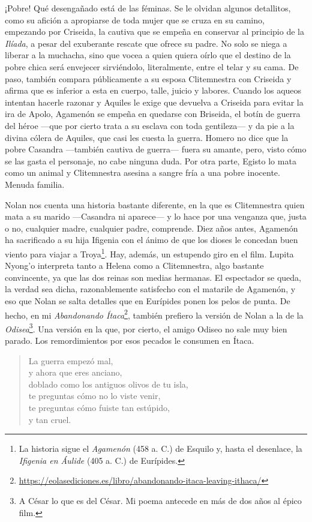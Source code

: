 \documentclass[11pt,a4paper]{article}
\begin{document}
¡Pobre! Qué desengañado está de las féminas. Se le olvidan algunos detallitos, como su afición a apropiarse de toda mujer que se cruza en su camino, empezando por Criseida, la cautiva que se empeña en conservar al principio de la \emph{Ilíada}, a pesar del exuberante rescate que ofrece su padre. No solo se niega a liberar a la muchacha, sino que vocea a quien quiera oírlo que el destino de la pobre chica será envejecer sirviéndolo, literalmente, entre el telar y su cama. De paso, también compara públicamente a su esposa Clitemnestra con Criseida y afirma que es inferior a esta en cuerpo, talle, juicio y labores. Cuando los aqueos intentan hacerle razonar y Aquiles le exige que devuelva a Criseida para evitar la ira de Apolo, Agamenón se empeña en quedarse con Briseida, el botín de guerra del héroe ---que por cierto trata a su esclava con toda gentileza--- y da pie a la divina cólera de Aquiles, que casi les cuesta la guerra. Homero no dice que la pobre Casandra ---también cautiva de guerra--- fuera su amante, pero, visto cómo se las gasta el personaje, no cabe ninguna duda. Por otra parte, Egisto lo mata como un animal y Clitemnestra asesina a sangre fría a una pobre inocente. Menuda familia.

Nolan nos cuenta una historia bastante diferente, en la que es Clitemnestra quien mata a su marido ---Casandra ni aparece--- y lo hace por una venganza que, justa o no, cualquier madre, cualquier padre, comprende. Diez años antes, Agamenón ha sacrificado a su hija Ifigenia con el ánimo de que los dioses le concedan buen viento para viajar a Troya\footnote{La historia sigue el \emph{Agamenón} (458 a. C.) de Esquilo y, hasta el desenlace, la \emph{Ifigenia en Áulide} (405 a. C.) de Eurípides.}. Hay, además, un estupendo giro en el film. Lupita Nyong'o interpreta tanto a Helena como a Clitemnestra, algo bastante convincente, ya que las dos reinas son medias hermanas. El espectador se queda, la verdad sea dicha, razonablemente satisfecho con el matarile de Agamenón, y eso que Nolan se salta detalles que en Eurípides ponen los pelos de punta. De hecho, en mi \emph{Abandonando Ítaca}\footnote{\url{https://eolasediciones.es/libro/abandonando-itaca-leaving-ithaca/}}, también prefiero la versión de Nolan a la de la \emph{Odisea}\footnote{A César lo que es del César. Mi poema antecede en más de dos años al épico film.}. Una versión en la que, por cierto, el amigo Odiseo no sale muy bien parado. Los remordimientos por esos pecados le consumen en Ítaca.

\begin{verse}
La guerra empezó mal,\\
y ahora que eres anciano,\\
doblado como los antiguos olivos de tu isla,\\
te preguntas cómo no lo viste venir,\\
te preguntas cómo fuiste tan estúpido,\\
y tan cruel.
\end{verse}
\end{document}
